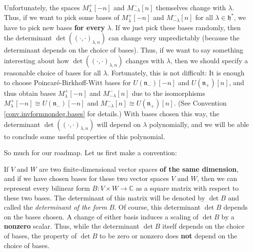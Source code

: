 \documentclass[etingof-lie.tex]{subfiles}
\begin{document}
Unfortunately, the spaces $M_{\lambda}^{+}\left[  -n\right]  $ and
$M_{-\lambda}^{-}\left[  n\right]  $ themselves change with $\lambda$. Thus,
if we want to pick some bases of $M_{\lambda}^{+}\left[  -n\right]  $ and
$M_{-\lambda}^{-}\left[  n\right]  $ for all $\lambda\in\mathfrak{h}^{\ast}$,
we have to pick new bases \textbf{for every }$\lambda$. If we just pick these
bases randomly, then the determinant $\det\left(  \left(  \cdot,\cdot\right)
_{\lambda,n}\right)  $ can change very unpredictably (because the determinant
depends on the choice of bases). Thus, if we want to say something interesting
about how $\det\left(  \left(  \cdot,\cdot\right)  _{\lambda,n}\right)  $
changes with $\lambda$, then we should specify a reasonable choice of bases
for all $\lambda$. Fortunately, this is not difficult: It is enough to choose
Poincar\'{e}-Birkhoff-Witt bases for $U\left(  \mathfrak{n}_{-}\right)
\left[  -n\right]  $ and $U\left(  \mathfrak{n}_{+}\right)  \left[  n\right]
$, and thus obtain bases $M_{\lambda}^{+}\left[  -n\right]  $ and
$M_{-\lambda}^{-}\left[  n\right]  $ due to the isomorphisms $M_{\lambda}%
^{+}\left[  -n\right]  \cong U\left(  \mathfrak{n}_{-}\right)  \left[
-n\right]  $ and $M_{-\lambda}^{-}\left[  n\right]  \cong U\left(
\mathfrak{n}_{+}\right)  \left[  n\right]  $. (See Convention
\ref{conv.invformnondeg.bases} for details.) With bases chosen this way, the
determinant $\det\left(  \left(  \cdot,\cdot\right)  _{\lambda,n}\right)  $
will depend on $\lambda$ polynomially, and we will be able to conclude some
useful properties of this polynomial.

So much for our roadmap. Let us first make a convention:

\begin{Convention}
If $V$ and $W$ are two finite-dimensional vector spaces \textbf{of the same
dimension}, and if we have chosen bases for these two vector spaces $V$ and
$W$, then we can represent every bilinear form $B:V\times W\rightarrow
\mathbb{C}$ as a square matrix with respect to these two bases. The
determinant of this matrix will be denoted by $\det B$ and called the
\textit{determinant of the form }$B$. Of course, this determinant $\det B$
depends on the bases chosen. A change of either basis induces a scaling of
$\det B$ by a \textbf{nonzero} scalar. Thus, while the determinant $\det B$
itself depends on the choice of bases, the property of $\det B$ to be zero or
nonzero does \textbf{not} depend on the choice of bases.
\end{Convention}
\end{document}
